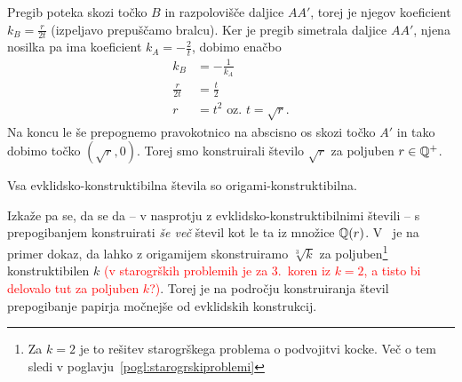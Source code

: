 \begin{dokaz}
    Pregib poteka skozi točko $B$ in razpolovišče daljice $AA'$, torej je njegov koeficient $k_B = \frac{r}{2t}$ (izpeljavo prepuščamo bralcu). Ker je pregib simetrala daljice $AA'$, njena nosilka pa ima koeficient $k_A = - \frac{2}{t}$, dobimo enačbo
    \begin{align*}
        k_B &= - \frac{1}{k_A}\\
        \frac{r}{2t} &= \frac{t}{2}\\
        r &= t^2 \text{ oz. } t = \sqrt{r}.
    \end{align*}
    Na koncu le še prepognemo pravokotnico na abscisno os skozi točko $A'$ in tako dobimo točko $(\sqrt{r}, 0)$. Torej smo konstruirali število $\sqrt{r}$ za poljuben $r \in \mathbb Q^{+}$.
\end{dokaz}

\begin{posledica}
    Vsa evklidsko-konstruktibilna števila so origami-konstruktibilna.
\end{posledica}

Izkaže pa se, da se da -- v nasprotju z evklidsko-konstruktibilnimi števili -- s prepogibanjem konstruirati \emph{še več} števil kot le ta iz množice $\mathbb Q(r)$. V~\cite[str.\ 156]{geometricconstructions} je na primer dokaz, da lahko z origamijem skonstruiramo $\sqrt[3]{k} $ za poljuben\footnote{Za $k = 2$ je to rešitev starogrškega problema o podvojitvi kocke. Več o tem sledi v poglavju~\ref{pogl:starogrskiproblemi}} konstruktibilen $k$ \textcolor{red}{(v starogrških problemih je za 3.\ koren iz $k = 2$, a tisto bi delovalo tut za poljuben $k$?)}. Torej je na področju konstruiranja števil prepogibanje papirja močnejše od evklidskih konstrukcij.